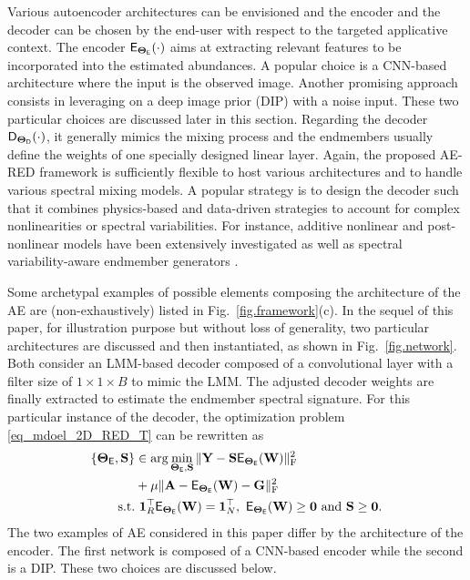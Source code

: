\documentclass[journal,a4paper]{IEEEtran}
\newcommand{\bfY}{\mathbf{Y}}
\newcommand{\bTheta}{\boldsymbol{\Theta}}
\newcommand{\MATabund}{\mathbf{A}}
\newcommand{\MATend}{\mathbf{S}}
\begin{document}
Various autoencoder architectures can be envisioned and the encoder and the decoder can be chosen by the end-user with respect to the targeted applicative context. The encoder $\mathsf{E}_{\bTheta_{\sf E}}(\cdot)$ aims at extracting relevant features to be incorporated into the estimated abundances. A popular choice is a CNN-based architecture where the input is the observed image. Another promising approach consists in leveraging on a deep image prior (DIP) with a noise input. These two particular choices are discussed later in this section. Regarding the decoder $\mathsf{D}_{\bTheta_{\sf D}}(\cdot)$, it generally mimics the mixing process and the endmembers usually define the weights of one specially designed linear layer. Again, the proposed AE-RED framework is sufficiently flexible to host various architectures and to handle various spectral mixing models. A popular strategy is to design the decoder such that it combines physics-based and data-driven strategies to account for complex nonlinearities or spectral variabilities. For instance, additive nonlinear and post-nonlinear models have been extensively investigated \cite{zhao2021hyperspectral,zhao2021lstm,shahid2021unsupervised}  as well as spectral variability-aware endmember generators \cite{borsoi2019deep,shi2021probabilistic}.

Some archetypal examples of possible elements composing the architecture of the AE are (non-exhaustively) listed in Fig.~\ref{fig.framework}(c). In the sequel of this paper, for illustration purpose but without loss of generality, two particular architectures are discussed and then instantiated, as shown in Fig.~\ref{fig.network}. Both consider an LMM-based decoder composed of a convolutional layer with a filter size of $1\times 1\times B$ to mimic the LMM. The adjusted decoder weights are finally extracted to estimate the endmember spectral signature. For this particular instance of the decoder, the optimization problem  \eqref{eq_mdoel_2D_RED_T} can be rewritten as
\begin{align}\label{eq_mdoel_2D_RED_T_2}
  \left\{\bTheta_{\sf E}, 
  \mathbf{S}\right\}&\in\arg\min_{\bTheta_{\sf E}, 
  \mathbf{S}}\|\bfY-\mathbf{S}
  \mathsf{E}_{\bTheta_{\sf E}}(\mathbf{W})\|_{\text{F}}^2\\
  &+\mu\|\MATabund-\mathsf{E}_{\bTheta_{\sf E}}(\mathbf{W})-\mathbf{G}\|_{\text{F}}^{2} \nonumber\\
  \text{s.t.}& \ \boldsymbol{1}^{\top}_{R} \mathsf{E}_{\bTheta_{\sf E}}(\mathbf{W})=\boldsymbol{1}_{N}^{\top},~ \mathsf{E}_{\bTheta_{\sf E}}(\mathbf{W})\geq \boldsymbol{0}~\text{and}~\MATend\geq \boldsymbol{0}. \nonumber
\end{align}
The two examples of AE considered in this paper differ by the architecture of the encoder. The first network is composed of a CNN-based encoder while the second is a DIP. These two choices are discussed below.
\end{document}
